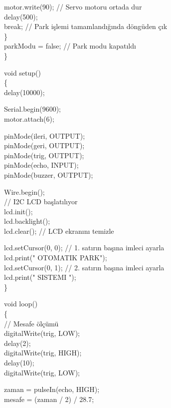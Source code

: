     motor.write(90); // Servo motoru ortada dur\\
    delay(500);\\
    break; // Park işlemi tamamlandığında döngüden çık\\
  \}\\
  parkModu = false; // Park modu kapatıldı\\
\}

void setup()\\
\{\\
  delay(10000);

  Serial.begin(9600);\\
  motor.attach(6);

  pinMode(ileri, OUTPUT);\\
  pinMode(geri, OUTPUT);\\
  pinMode(trig, OUTPUT);\\
  pinMode(echo, INPUT);\\
  pinMode(buzzer, OUTPUT);

  Wire.begin();\\
  // I2C LCD başlatılıyor\\
  lcd.init();\\
  lcd.backlight();\\
  lcd.clear(); // LCD ekranını temizle

  lcd.setCursor(0, 0); // 1. satırın başına imleci ayarla\\
  lcd.print(" OTOMATIK PARK");\\
  lcd.setCursor(0, 1); // 2. satırın başına imleci ayarla\\
  lcd.print("     SISTEMI  ");\\
\}

void loop()\\
\{\\
  // Mesafe ölçümü\\
  digitalWrite(trig, LOW);\\
  delay(2);\\
  digitalWrite(trig, HIGH);\\
  delay(10);\\
  digitalWrite(trig, LOW);

  zaman = pulseIn(echo, HIGH);\\
  mesafe = (zaman / 2) / 28.7;


